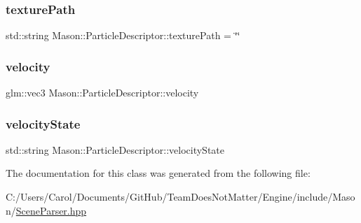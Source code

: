\hypertarget{class_mason_1_1_particle_descriptor_a060bb2c95075b3a19432beca816bfa76}{}\label{class_mason_1_1_particle_descriptor_a060bb2c95075b3a19432beca816bfa76} 
\subsubsection{\texorpdfstring{texture\+Path}{texturePath}}
{\footnotesize\ttfamily std\+::string Mason\+::\+Particle\+Descriptor\+::texture\+Path = \char`\"{}\char`\"{}}

\hypertarget{class_mason_1_1_particle_descriptor_a015f949d8089667eea16540fb750f70a}{}\label{class_mason_1_1_particle_descriptor_a015f949d8089667eea16540fb750f70a} 
\subsubsection{\texorpdfstring{velocity}{velocity}}
{\footnotesize\ttfamily glm\+::vec3 Mason\+::\+Particle\+Descriptor\+::velocity}

\hypertarget{class_mason_1_1_particle_descriptor_ac84b802189304538944403fdff16faf2}{}\label{class_mason_1_1_particle_descriptor_ac84b802189304538944403fdff16faf2} 
\subsubsection{\texorpdfstring{velocity\+State}{velocityState}}
{\footnotesize\ttfamily std\+::string Mason\+::\+Particle\+Descriptor\+::velocity\+State}



The documentation for this class was generated from the following file\+:\begin{DoxyCompactItemize}
\item 
C\+:/\+Users/\+Carol/\+Documents/\+Git\+Hub/\+Team\+Does\+Not\+Matter/\+Engine/include/\+Mason/\hyperlink{_scene_parser_8hpp}{Scene\+Parser.\+hpp}\end{DoxyCompactItemize}
